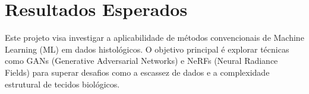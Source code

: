\section{Resultados Esperados}

Este projeto visa investigar a aplicabilidade de métodos convencionais de Machine Learning (ML) em dados histológicos.  O objetivo principal é explorar técnicas como GANs (Generative Adversarial Networks) e NeRFs (Neural Radiance Fields) para superar desafios como a escassez de dados e a complexidade estrutural de tecidos biológicos.
